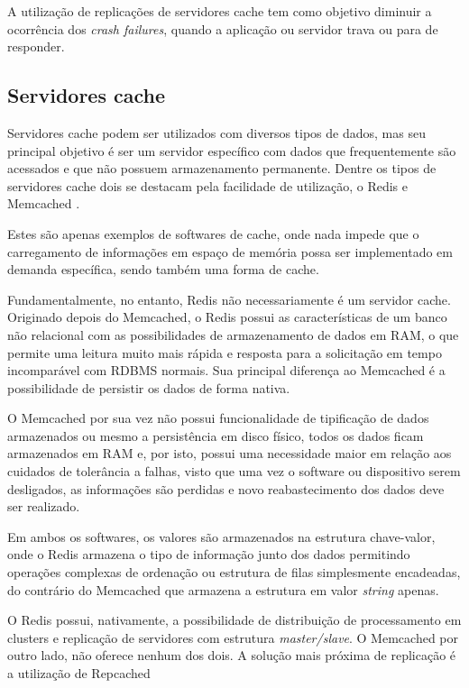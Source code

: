 \documentclass[conference]{IEEEtran}
\begin{document}
A utilização de replicações de servidores cache tem como objetivo diminuir a ocorrência dos \textit{crash failures}, quando a aplicação ou servidor trava ou para de responder. 

\subsection{Servidores cache}

Servidores cache podem ser utilizados com diversos tipos de dados, mas seu principal objetivo é ser um servidor específico com dados que frequentemente são acessados e que não possuem armazenamento permanente. Dentre os tipos de servidores cache dois se destacam pela facilidade de utilização, o Redis e Memcached \cite{memcached}.

Estes são apenas exemplos de softwares de cache, onde nada impede que o carregamento de informações em espaço de memória possa ser implementado em demanda específica, sendo também uma forma de cache.

Fundamentalmente, no entanto, Redis não necessariamente é um servidor cache. Originado depois do Memcached, o Redis possui as características de um banco não relacional com as possibilidades de armazenamento de dados em RAM, o que permite uma leitura muito mais rápida e resposta para a solicitação em tempo incomparável com RDBMS normais. Sua principal diferença ao Memcached é a possibilidade de persistir os dados de forma nativa.

O Memcached por sua vez não possui funcionalidade de tipificação de dados armazenados ou mesmo a persistência em disco físico, todos os dados ficam armazenados em RAM e, por isto, possui uma necessidade maior em relação aos cuidados de tolerância a falhas, visto que uma vez o software ou dispositivo serem desligados, as informações são perdidas e novo reabastecimento dos dados deve ser realizado.

Em ambos os softwares, os valores são armazenados na estrutura chave-valor, onde o Redis armazena o tipo de informação junto dos dados permitindo operações complexas de ordenação ou estrutura de filas simplesmente encadeadas, do contrário do Memcached que armazena a estrutura em valor \textit{string} apenas.

O Redis possui, nativamente, a possibilidade de distribuição de processamento em clusters e replicação de servidores com estrutura \textit{master/slave}. O Memcached por outro lado, não oferece nenhum dos dois. A solução mais próxima de replicação é a utilização de Repcached \cite{repcached}
\end{document}
